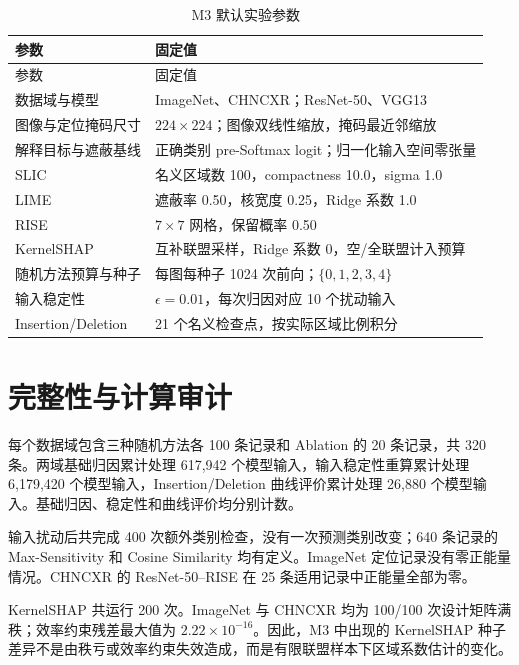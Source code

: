 {\small
    \begin{xltabular}{\textwidth}{>{\raggedright\arraybackslash}p{4.0cm}X}
        \caption{M3 默认实验参数}\label{tab:m3-config} \\
        \toprule
        参数 & 固定值 \\
        \midrule
        \endfirsthead
        \toprule
        参数 & 固定值 \\
        \midrule
        \endhead
        数据域与模型 & ImageNet、CHNCXR；ResNet-50、VGG13 \\
        图像与定位掩码尺寸 & $224\times224$；图像双线性缩放，掩码最近邻缩放 \\
        解释目标与遮蔽基线 & 正确类别 pre-Softmax logit；归一化输入空间零张量 \\
        SLIC & 名义区域数 100，compactness 10.0，sigma 1.0 \\
        LIME & 遮蔽率 0.50，核宽度 0.25，Ridge 系数 1.0 \\
        RISE & $7\times7$ 网格，保留概率 0.50 \\
        KernelSHAP & 互补联盟采样，Ridge 系数 0，空/全联盟计入预算 \\
        随机方法预算与种子 & 每图每种子 1024 次前向；$\{0,1,2,3,4\}$ \\
        输入稳定性 & $\epsilon=0.01$，每次归因对应 10 个扰动输入 \\
        Insertion/Deletion & 21 个名义检查点，按实际区域比例积分 \\
        \bottomrule
    \end{xltabular}
}

\section{完整性与计算审计}


\FloatBarrier

每个数据域包含三种随机方法各 100 条记录和 Ablation 的 20 条记录，共 320 条。两域基础归因累计处理 617,942 个模型输入，输入稳定性重算累计处理 6,179,420 个模型输入，Insertion/Deletion 曲线评价累计处理 26,880 个模型输入。基础归因、稳定性和曲线评价均分别计数。

输入扰动后共完成 400 次额外类别检查，没有一次预测类别改变；640 条记录的 Max-Sensitivity 和 Cosine Similarity 均有定义。ImageNet 定位记录没有零正能量情况。CHNCXR 的 ResNet-50--RISE 在 25 条适用记录中正能量全部为零。

KernelSHAP 共运行 200 次。ImageNet 与 CHNCXR 均为 100/100 次设计矩阵满秩；效率约束残差最大值为 $2.22\times10^{-16}$。因此，M3 中出现的 KernelSHAP 种子差异不是由秩亏或效率约束失效造成，而是有限联盟样本下区域系数估计的变化。


